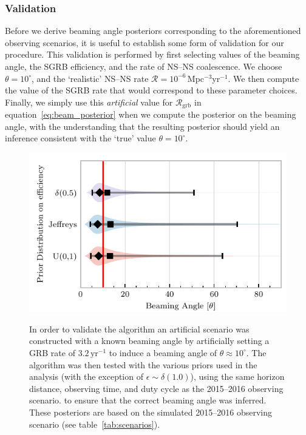 \documentclass[twocolumn]{aastex61}
\newcommand{\grbrate}{{{\mathcal R}_{\mathrm{grb}}}}
\newcommand{\cbcrate}{{{\mathcal R}}}
\newcommand{\yr}{\mathrm{yr}}
\newcommand{\BNS}{\ac{NS}--\ac{NS}\xspace}
\begin{document}
\subsubsection{Validation}
Before we derive beaming angle posteriors corresponding to the
aforementioned observing scenarios, it is useful to establish some
form of validation for our procedure.  This validation is performed by
first selecting values of the beaming angle, the \ac{SGRB} efficiency,
and the rate of \BNS coalescence.  We choose $\theta=10^{\circ}$, and
the `realistic' \BNS rate $\cbcrate = 10^{-6}$\,Mpc$^{-3}$yr$^{-1}$.
We then compute the value of the \ac{SGRB} rate that would correspond
to these parameter choices.  Finally, we simply use this
\emph{artificial} value for $\grbrate$ in
equation~\ref{eq:beam_posterior} when we compute the posterior on the
beaming angle, with the understanding that the resulting posterior
should yield an inference consistent with the `true' value
$\theta=10^{\circ}$.
%
\begin{figure}%
\centering
{\includegraphics[width=\linewidth]{O1_injections_violin.pdf}}
\caption{ In order to validate the algorithm an artificial scenario
  was constructed with a known beaming angle by artificially setting a
  GRB rate of $3.2\, \yr^{-1}$ to induce a beaming angle of $\theta \approx 10^{\circ}$.
  The algorithm was then tested with the various priors used in the
  analysis (with the exception of $\epsilon \sim \delta(1.0)$), using
  the same horizon distance, observing time, and duty cycle as the 2015--2016
  observing scenario. to ensure that the correct beaming angle was inferred. 
  These posteriors are based on the simulated 2015--2016 observing scenario (see
  table~\ref{tab:scenarios}).
  \label{fig:injjetposterio2016}}
\end{figure}
\end{document}

